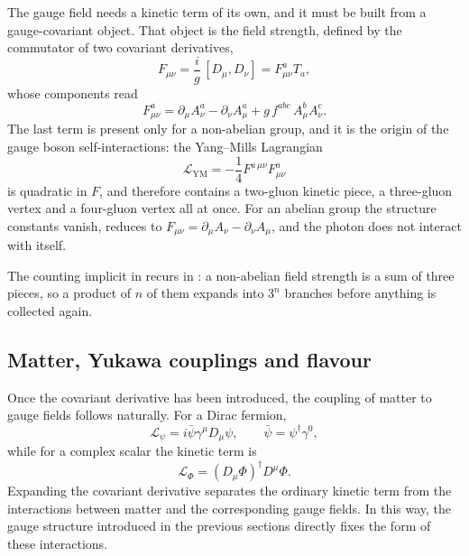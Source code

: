 The gauge field needs a kinetic term of its own, and it must be built from a
gauge-covariant object. That object is the field strength, defined by the
commutator of two covariant derivatives,
\begin{equation}
    F_{\mu\nu} = \frac{i}{g}\,[D_\mu, D_\nu] = F^a_{\mu\nu} T_a ,
\end{equation}
whose components read
\begin{equation}
    F^a_{\mu\nu}
    = \partial_\mu A^a_\nu - \partial_\nu A^a_\mu
    + g\, f^{abc}\, A^b_\mu A^c_\nu .
    \label{eq:theory-fs}
\end{equation}
The last term is present only for a non-abelian group, and it is the origin
of the gauge boson self-interactions: the Yang--Mills Lagrangian
\begin{equation}
    \mathcal{L}_{\mathrm{YM}} = -\frac14 F^{a\,\mu\nu} F^a_{\mu\nu} 
    \label{eq:theory-ym}
\end{equation}
is quadratic in $F$, and therefore contains a two-gluon kinetic piece, a
three-gluon vertex and a four-gluon vertex all at once. For an abelian group
the structure constants vanish,  reduces to
$F_{\mu\nu}=\partial_\mu A_\nu - \partial_\nu A_\mu$, and the photon does not
interact with itself.

The counting implicit in  recurs in
: a non-abelian field strength is a sum of three
pieces, so a product of $n$ of them expands into $3^n$ branches before
anything is collected again.

\subsection{Matter, Yukawa couplings and flavour}
\label{sec:theory-matter}

Once the covariant derivative has been introduced, the coupling of matter to
gauge fields follows naturally. For a Dirac fermion,
\begin{equation}
    \mathcal{L}_\psi=
    i\bar\psi\gamma^\mu D_\mu\psi,
    \qquad
    \bar\psi=\psi^\dagger\gamma^0,
\end{equation}
while for a complex scalar the kinetic term is
\begin{equation}
    \mathcal{L}_\Phi
    =
    (D_\mu\Phi)^\dagger D^\mu\Phi .
\end{equation}
Expanding the covariant derivative separates the ordinary kinetic term from
the interactions between matter and the corresponding gauge fields. In this
way, the gauge structure introduced in the previous sections directly fixes
the form of these interactions.

